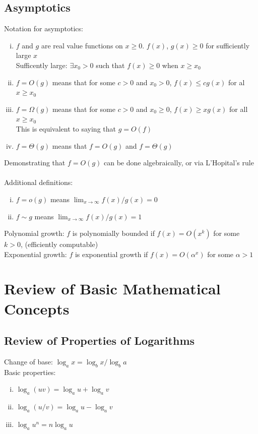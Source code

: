 \documentclass{article}
\begin{document}
			\subsection{Asymptotics}
				Notation for asymptotics:
				\begin{enumerate}[(i)]
					\item $f$ and $g$ are real value functions on $x \geq 0$. $f(x)$, $g(x) \geq 0$ for sufficiently large $x$ \\
					Sufficently large: $\exists x_0 > 0$ such that $f(x) \geq 0$ when $x \geq x_0$
					\item $f = O(g)$ means that for some $c > 0$ and $x_0 > 0$, $f(x) \leq cg(x)$ for al $x \geq x_0$
					\item $f = \Omega(g)$ means that for some $c > 0$ and $x_0 \geq 0$, $f(x) \geq xg(x)$ for all $x \geq x_0$ \\
					This is equivalent to saying that $g = O(f)$
					\item $f = \Theta(g)$ means that $f = O(g)$ and $f = \Theta(g)$
					\end{enumerate}
				Demonstrating that $f = O(g)$ can be done algebraically, or via L'Hopital's rule \\
				\\
				Additional definitions:
				\begin{enumerate}[(i)]
					\item $f = o(g)$ means $\lim_{x \to \infty} f(x)/g(x) = 0$
					\item $f \sim g$ means $\lim_{x \to \infty} f(x)/g(x) = 1$
					\end{enumerate}
				Polynomial growth: $f$ is polynomially bounded if $f(x) = O(x^k)$ for some $k > 0$, (efficiently computable) \\
				Exponential growth: $f$ is exponential growth if $f(x) = O(\alpha^x)$ for some $\alpha > 1$

	\appendix

	\section{Review of Basic Mathematical Concepts}
		\subsection{Review of Properties of Logarithms}
			Change of base: $\log_a x = \log_b x/\log_b a$ \\
			Basic properties:
			\begin{enumerate}[(i)]
				\item $\log_a(uv) = \log_a u + \log_a v$
				\item $\log_a(u / v) = \log_a u - \log_a v$
				\item $\log_a u^n = n \log_a u$
				\end{enumerate}



	
\end{document}
